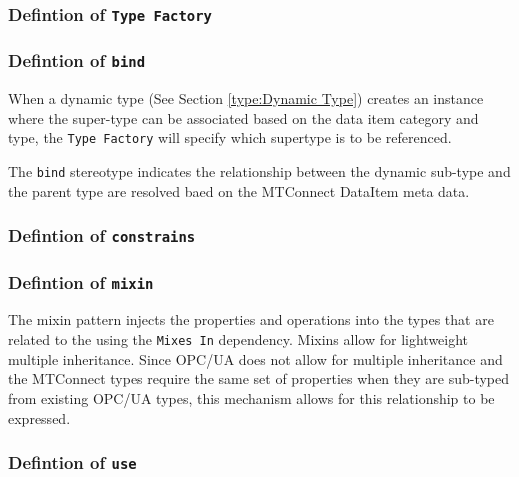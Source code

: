 \FloatBarrier



\subsubsection{Defintion of  \texttt{Type Factory}} \label{type:Type Factory}

\FloatBarrier



\subsubsection{Defintion of  \texttt{bind}} \label{type:bind}

\FloatBarrier

When a dynamic type (See Section \ref{type:Dynamic Type}) creates an instance where the super-type
can be associated based on the data item category and type, the \texttt{Type Factory} will 
specify which supertype is to be referenced.

The \texttt{bind} stereotype indicates the relationship between the dynamic sub-type and the 
parent type are resolved baed on the MTConnect DataItem meta data.

\subsubsection{Defintion of  \texttt{constrains}} \label{type:constrains}

\FloatBarrier



\subsubsection{Defintion of  \texttt{mixin}} \label{type:mixin}

\FloatBarrier

The mixin pattern injects the properties and operations into the types 
that are related to the using the \texttt{Mixes In} dependency. Mixins allow for
lightweight multiple inheritance. Since OPC/UA does not allow for multiple inheritance 
and the MTConnect  types require the same set of properties when they are sub-typed
from existing OPC/UA types, this mechanism allows for this relationship to be expressed.


\subsubsection{Defintion of  \texttt{use}} \label{type:use}

